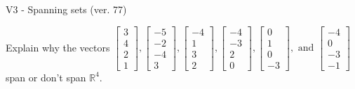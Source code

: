 \begin{exercise}
  \begin{exerciseTitle}V3 - Spanning sets (ver. 77)\end{exerciseTitle}
  \begin{exerciseStatement}
    Explain why the vectors \(\left[\begin{array}{r}
3 \\
4 \\
2 \\
1
\end{array}\right] , \left[\begin{array}{r}
-5 \\
-2 \\
-4 \\
3
\end{array}\right] , \left[\begin{array}{r}
-4 \\
1 \\
3 \\
2
\end{array}\right] , \left[\begin{array}{r}
-4 \\
-3 \\
2 \\
0
\end{array}\right] , \left[\begin{array}{r}
0 \\
1 \\
0 \\
-3
\end{array}\right] , \text{ and } \left[\begin{array}{r}
-4 \\
0 \\
-3 \\
-1
\end{array}\right]\) span or don't span \(\mathbb{R}^4\). 
	



\end{exerciseStatement}
\end{exercise}
